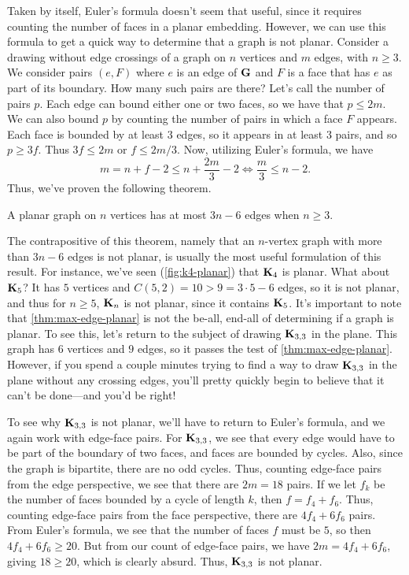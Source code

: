 Taken by itself, Euler's formula doesn't seem that useful, since it
requires counting the number of faces in a planar embedding. However,
we can use this formula to get a quick way to determine that a graph
is not planar.  Consider a drawing without edge crossings
of a graph on $n$ vertices and $m$ edges, with $n\ge3$.
 We consider pairs $(e,F)$ where $e$ is an edge of
$\mathbf{G}$ and $F$ is a face that has $e$ as part of its boundary. How
many such pairs are there? Let's call the number of pairs $p$. Each
edge can bound either one or two faces, so we have that $p\leq
2m$. We can also bound $p$ by counting the number of pairs in which a
face $F$ appears. Each face is bounded by at least $3$ edges, so it
appears in at least $3$ pairs, and so $p\geq 3f$. Thus $3f\leq 2m$ or
$f\leq 2m/3$. Now, utilizing Euler's formula, we have
\[m = n+f-2 \leq n + \frac{2m}{3} - 2 \iff \frac{m}{3} \leq n-2.\]
Thus, we've proven the following theorem.

\begin{theorem}\label{thm:max-edge-planar}
  A planar graph on $n$ vertices has at most $3n-6$ edges when
 $n\ge 3$.
\end{theorem}

The contrapositive of this theorem, namely that an $n$-vertex graph
with more than $3n-6$ edges is not planar, is usually the most useful
formulation of this result. For instance, we've seen
(\autoref{fig:k4-planar}) that $\mathbf{K}_4$ is planar. What about
$\mathbf{K}_5$? It has $5$ vertices and $C(5,2)=10 > 9 = 3\cdot 5-6$ edges,
so it is not planar, and thus for $n\geq 5$, $\mathbf{K}_n$ is not planar,
since it contains $\mathbf{K}_5$. It's important to note that
\autoref{thm:max-edge-planar} is not the be-all, end-all of
determining if a graph is planar. To see this, let's return to the
subject of drawing $\mathbf{K}_{3,3}$ in the plane. This graph has $6$
vertices and $9$ edges, so it passes the test of
\autoref{thm:max-edge-planar}. However, if you spend a couple minutes
trying to find a way to draw $\mathbf{K}_{3,3}$ in the plane without
any crossing edges, you'll pretty quickly begin to believe that it
can't be done---and you'd be right!

To see why $\mathbf{K}_{3,3}$ is not planar, we'll have to return to Euler's
formula, and we again work with edge-face pairs. For $\mathbf{K}_{3,3}$, we
see that every edge would have to be part of the boundary of two
faces, and faces are bounded by cycles. Also, since the graph is
bipartite, there are no odd cycles. Thus, counting edge-face pairs
from the edge perspective, we see that there are $2m = 18$ pairs. If
we let $f_k$ be the number of faces bounded by a cycle of length $k$,
then $f= f_4 + f_6$. Thus, counting edge-face pairs from the face
perspective, there are $4f_4 + 6f_6$ pairs. From Euler's formula, we
see that the number of faces $f$ must be $5$, so then $4f_4+6f_6\geq
20$. But from our count of edge-face pairs, we have $2m=4f_4+6f_6$,
giving $18\geq 20$, which is clearly absurd. Thus, $\mathbf{K}_{3,3}$ is not
planar.

